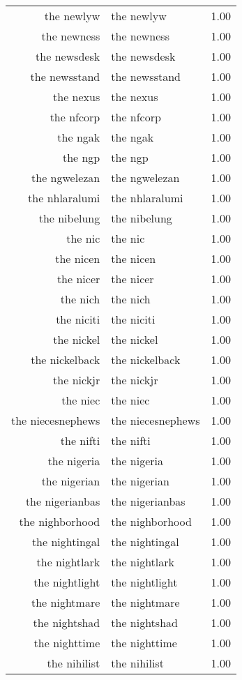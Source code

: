 \begin{table}[ht]
\begin{tabular}{rlr}
  the newlyw & the newlyw & 1.00 \\ 
  the newness & the newness & 1.00 \\ 
  the newsdesk & the newsdesk & 1.00 \\ 
  the newsstand & the newsstand & 1.00 \\ 
  the nexus & the nexus & 1.00 \\ 
  the nfcorp & the nfcorp & 1.00 \\ 
  the ngak & the ngak & 1.00 \\ 
  the ngp & the ngp & 1.00 \\ 
  the ngwelezan & the ngwelezan & 1.00 \\ 
  the nhlaralumi & the nhlaralumi & 1.00 \\ 
  the nibelung & the nibelung & 1.00 \\ 
  the nic & the nic & 1.00 \\ 
  the nicen & the nicen & 1.00 \\ 
  the nicer & the nicer & 1.00 \\ 
  the nich & the nich & 1.00 \\ 
  the niciti & the niciti & 1.00 \\ 
  the nickel & the nickel & 1.00 \\ 
  the nickelback & the nickelback & 1.00 \\ 
  the nickjr & the nickjr & 1.00 \\ 
  the niec & the niec & 1.00 \\ 
  the niecesnephews & the niecesnephews & 1.00 \\ 
  the nifti & the nifti & 1.00 \\ 
  the nigeria & the nigeria & 1.00 \\ 
  the nigerian & the nigerian & 1.00 \\ 
  the nigerianbas & the nigerianbas & 1.00 \\ 
  the nighborhood & the nighborhood & 1.00 \\ 
  the nightingal & the nightingal & 1.00 \\ 
  the nightlark & the nightlark & 1.00 \\ 
  the nightlight & the nightlight & 1.00 \\ 
  the nightmare & the nightmare & 1.00 \\ 
  the nightshad & the nightshad & 1.00 \\ 
  the nighttime & the nighttime & 1.00 \\ 
  the nihilist & the nihilist & 1.00 \\ 

\end{tabular}
\end{table}
